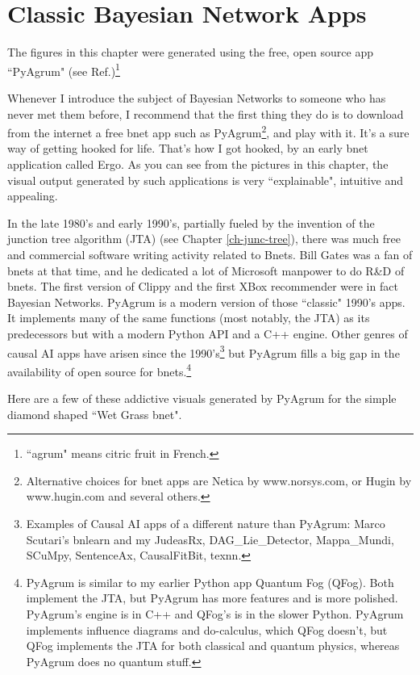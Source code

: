 \chapter{Classic Bayesian Network Apps}
\label{ch-bnet-apps}

The figures in this chapter were generated using
the free, open source app ``PyAgrum" (see Ref.\cite{pyagrum})\footnote{``agrum" means citric fruit in French. }


Whenever I introduce the subject of Bayesian Networks
to someone who has never met them before, I recommend that the first thing they do is to
download from the internet a free bnet app  such as PyAgrum\footnote{Alternative choices for bnet apps are Netica by www.norsys.com, or Hugin by www.hugin.com and several others.}, and play with it. It's a sure way of getting hooked
for life. That's how I got hooked, by an early bnet application called Ergo. As you can see from the pictures in this chapter,
the visual output generated by such applications is very ``explainable", intuitive and appealing.

  
In the late 1980's and early 1990's, partially fueled by the invention of
the junction tree algorithm (JTA) (see Chapter \ref{ch-junc-tree}), there was much free and commercial software writing activity related to Bnets. Bill Gates was a fan of bnets at that time, and he dedicated a lot of Microsoft manpower to do R\&D of bnets. The first version of Clippy and the first XBox recommender were in fact Bayesian Networks. PyAgrum is a modern version of those ``classic" 1990's apps. It implements many of the same functions (most notably, the JTA) as its predecessors but with a modern Python API and a C++ engine. Other genres of causal AI apps have arisen since the 1990's\footnote{Examples of Causal AI apps of a different nature than PyAgrum:  Marco Scutari's bnlearn and my JudeasRx, DAG\_Lie\_Detector, Mappa\_Mundi, SCuMpy, SentenceAx, CausalFitBit, texnn.} but PyAgrum fills a big gap in the availability of open source for bnets.\footnote{PyAgrum is similar to my earlier Python app Quantum Fog (QFog). Both implement the JTA, but PyAgrum  has more features and is more polished.
PyAgrum's engine is in C++ and QFog's is in the slower Python.  PyAgrum implements influence diagrams
and do-calculus, which QFog doesn't, but QFog implements the JTA for both classical and quantum physics, whereas PyAgrum does no quantum stuff.}

Here are a few of these addictive visuals generated by PyAgrum
for the simple diamond shaped  ``Wet Grass bnet".

